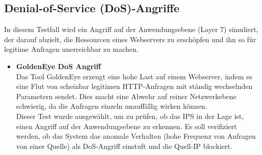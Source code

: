\subsection{Denial-of-Service (DoS)-Angriffe}
In diesem Testfall wird ein Angriff auf der Anwendungsebene (Layer 7) simuliert, der darauf abzielt, die Ressourcen eines Webservers zu erschöpfen und ihn so für legitime Anfragen unerreichbar zu machen.\\
\begin{itemize}
\item \textbf{GoldenEye DoS Angriff}\\
 Das Tool GoldenEye erzeugt eine hohe Last auf einem Webserver, indem es eine Flut von scheinbar legitimen HTTP-Anfragen mit ständig wechselnden Parametern sendet. Dies macht eine Abwehr auf reiner Netzwerkebene schwierig, da die Anfragen einzeln unauffällig wirken können.\\
Dieser Test wurde ausgewählt, um zu prüfen, ob das IPS in der Lage ist, einen Angriff auf der Anwendungsebene zu erkennen. Es soll verifiziert werden, ob das System das anomale Verhalten (hohe Frequenz von Anfragen von einer Quelle) als DoS-Angriff einstuft und die Quell-IP blockiert.
\end{itemize}

